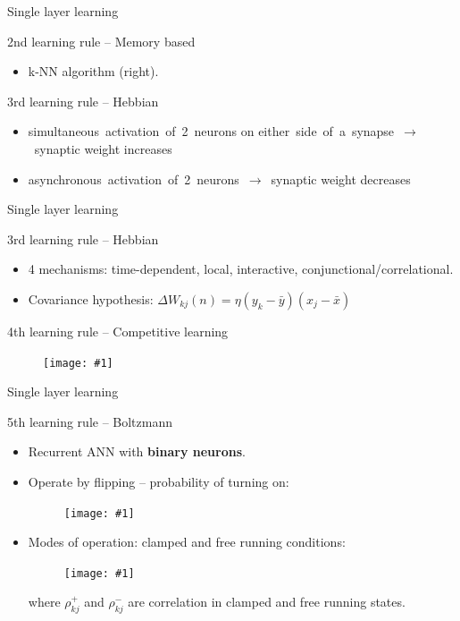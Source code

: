 \documentclass[9pt,t]{beamer}
\newcommand{\picEqHereWidth}[2] { %
    \begin{figure}[htp] 
        \centering
        \texttt{[image: \#1]}
    \end{figure}
}
\begin{document}
\begin{frame}{Single layer learning}
\begin{alertblock}{2nd learning rule -- Memory based}
\begin{itemize}
            \item k-NN algorithm (right).
        \end{itemize}
    \end{alertblock}
    \begin{alertblock}{3rd learning rule -- Hebbian}
        \begin{itemize}
            \item simultaneous~activation~of~2~neurons on either~side~of~a~synapse~$ \rightarrow $~synaptic weight increases
            \item asynchronous~activation~of~2~neurons~$ \rightarrow $~synaptic weight decreases
        \end{itemize}
    \end{alertblock}

\end{frame}

\begin{frame}{Single layer learning}
    \begin{alertblock}{3rd learning rule -- Hebbian}
        \begin{itemize}
            \item 4 mechanisms: time-dependent, local, interactive, conjunctional/correlational.
            \item Covariance hypothesis: $ \Delta W_{kj}(n) = \eta (y_k - \bar{y})(x_j - \bar{x}) $
        \end{itemize}
    \end{alertblock}
    \begin{alertblock}{4th learning rule -- Competitive learning}
        \picEqHereWidth{../images/competitive_learning}{0.7\linewidth}
    \end{alertblock}
\end{frame}

\begin{frame}{Single layer learning}
    \begin{alertblock}{5th learning rule -- Boltzmann}
        \begin{itemize}
            \item Recurrent ANN with \textbf{binary neurons}.
            \item Operate by flipping -- probability of turning on:
            \picEqHereWidth{../images/boltzmann_eq.png}{0.5\linewidth}
            \item Modes of operation: clamped and free running conditions:
            \picEqHereWidth{../images/boltzmann_eq2.png}{0.4\linewidth}
            where $ \rho^+_{kj} $ and $ \rho^-_{kj} $ are correlation in clamped and free running states.
        \end{itemize}
    \end{alertblock}
\end{frame}

\end{document}
